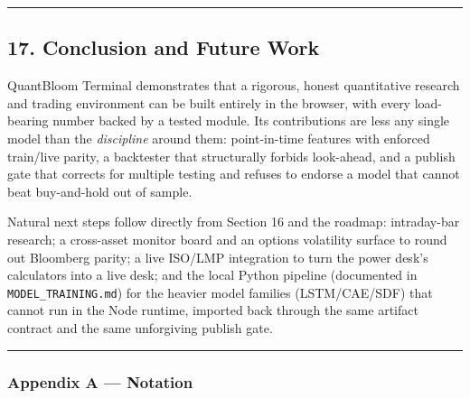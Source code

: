 \documentclass[
  11pt,
]{article}
\begin{document}
\begin{center}\rule{0.5\linewidth}{0.5pt}\end{center}

\subsection{17. Conclusion and Future
Work}\label{conclusion-and-future-work}

QuantBloom Terminal demonstrates that a rigorous, honest quantitative
research and trading environment can be built entirely in the browser,
with every load-bearing number backed by a tested module. Its
contributions are less any single model than the \emph{discipline}
around them: point-in-time features with enforced train/live parity, a
backtester that structurally forbids look-ahead, and a publish gate that
corrects for multiple testing and refuses to endorse a model that cannot
beat buy-and-hold out of sample.

Natural next steps follow directly from Section 16 and the roadmap:
intraday-bar research; a cross-asset monitor board and an options
volatility surface to round out Bloomberg parity; a live ISO/LMP
integration to turn the power desk's calculators into a live desk; and
the local Python pipeline (documented in \texttt{MODEL\_TRAINING.md})
for the heavier model families (LSTM/CAE/SDF) that cannot run in the
Node runtime, imported back through the same artifact contract and the
same unforgiving publish gate.

\begin{center}\rule{0.5\linewidth}{0.5pt}\end{center}

\subsubsection{Appendix A --- Notation}\label{appendix-a-notation}
\end{document}
